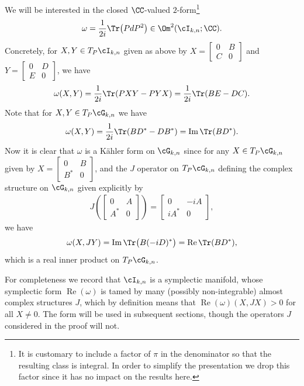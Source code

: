 We will be interested in the closed $\CC$-valued $2$-form\footnote{It is customary to include a factor of $\pi$ in the denominator so that the resulting class is integral. In order to simplify the presentation we drop this factor since it has no impact on the results here.}
\begin{gather*}
\omega = \frac {1}{2i} \Tr\big(P dP^2\big) \in \Om^2 ( \cI_{k,n} ; \CC).
\end{gather*}
Concretely, for $X,Y \in T_P \cI_{k,n}$ given as above by
$X =\left[
\begin{smallmatrix}
0 & B \\
C & 0
\end{smallmatrix}\right]$ and
$Y =\left[
\begin{smallmatrix}
0 & D \\
E & 0
\end{smallmatrix}\right]$, we have
\begin{gather*}
\omega(X,Y) = \frac {1}{2i} \Tr(PXY - PYX) = \frac {1}{2i} \Tr (BE - DC) .
\end{gather*}
Note that for $X,Y \in T_P \cG_{k,n}$ we have
\begin{gather*}
\omega(X,Y) = \frac {1}{2i} \Tr(BD^* - DB^*) = \operatorname{Im} \Tr(BD^*).
\end{gather*}
Now it is clear that $\omega$ is a K\"ahler form on $ \cG_{k,n}$ since for any $X \in T_P \cG_{k,n}$ given by
$X =\left[
\begin{smallmatrix}
0 & B \\
B^* & 0
\end{smallmatrix}\right]$, and the $J$ operator on $T_P \cG_{k,n}$ defining the complex structure on $\cG_{k,n}$ given explicitly by
\begin{gather*}
J\left(
\begin{bmatrix}
0 & A \\
A^* & 0
\end{bmatrix}
\right)
=
\begin{bmatrix}
0 & -iA \\
iA^* & 0
\end{bmatrix},
\end{gather*}
we have
\begin{gather*}
\omega(X,JY) = \operatorname{Im} \Tr \big(B (-iD)^*\big) = \operatorname{Re} \Tr(B D^*),
\end{gather*}
which is a real inner product on $T_P \cG_{k,n}$.

For completeness we record that $\cI_{k,n}$ is a symplectic manifold, whose symplectic form $\operatorname{Re}(\omega)$ is tamed by many (possibly non-integrable) almost complex structures $J$, which by definition means that $\operatorname{Re}(\omega)(X,JX) >0$ for all $X\neq 0$. The form will be used in subsequent sections, though the operators $J$ considered in the proof will not.

